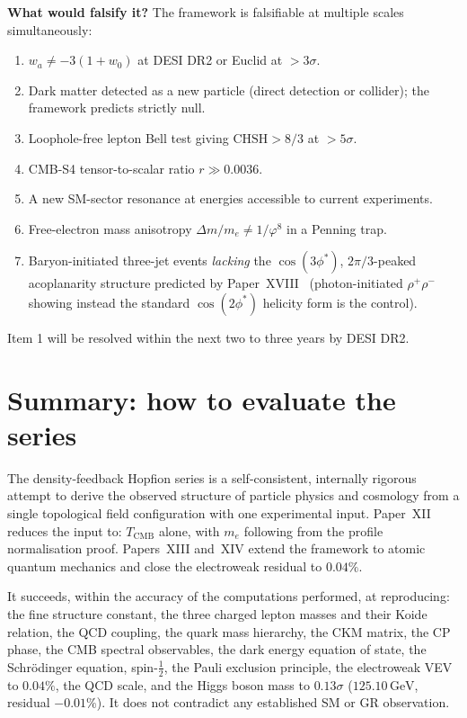 \documentclass[11pt,a4paper]{article}
\newcommand{\vp}{\varphi}
\newcommand{\TCMB}{T_{\mathrm{CMB}}}
\newcommand{\CHSH}{\mathrm{CHSH}}
\begin{document}
\textbf{What would falsify it?}
The framework is falsifiable at multiple scales simultaneously:
\begin{enumerate}[noitemsep]
\item $w_a \neq -3(1+w_0)$ at DESI DR2 or Euclid at $>3\sigma$.
\item Dark matter detected as a new particle (direct detection or collider); the framework predicts strictly null.
\item Loophole-free lepton Bell test giving $\CHSH > 8/3$ at $>5\sigma$.
\item CMB-S4 tensor-to-scalar ratio $r \gg 0.0036$.
\item A new SM-sector resonance at energies accessible to current experiments.
\item Free-electron mass anisotropy $\Delta m/m_e \neq 1/\vp^8$ in a Penning trap.
\item Baryon-initiated three-jet events \emph{lacking} the $\cos(3\phi^*)$,
  $2\pi/3$-peaked acoplanarity structure predicted by Paper~XVIII~\cite{Paper18}
  (photon-initiated $\rho^+\rho^-$ showing instead the standard $\cos(2\phi^*)$
  helicity form is the control).
\end{enumerate}
Item 1 will be resolved within the next two to three years by DESI DR2.

\section{Summary: how to evaluate the series}

The density-feedback Hopfion series is a self-consistent, internally rigorous
attempt to derive the observed structure of particle physics and cosmology from
a single topological field configuration with one experimental input.
Paper~XII~\cite{Paper12} reduces the input to: $\TCMB$ alone, with $m_e$ following from
the profile normalisation proof. Papers~XIII and~XIV extend the framework to atomic quantum mechanics and close the electroweak residual to $0.04\%$.

It succeeds, within the accuracy of the computations performed, at reproducing:
the fine structure constant, the three charged lepton masses and their Koide
relation, the QCD coupling, the quark mass hierarchy, the CKM matrix, the CP
phase, the CMB spectral observables, the dark energy equation of state,
the Schr\"odinger equation, spin-$\tfrac{1}{2}$, the Pauli exclusion
principle, the electroweak VEV to $0.04\%$, the QCD scale, and the Higgs boson mass
to $0.13\sigma$ ($125.10\,\mathrm{GeV}$, residual $-0.01\%$).
It does not contradict any established SM or GR observation.
\end{document}
